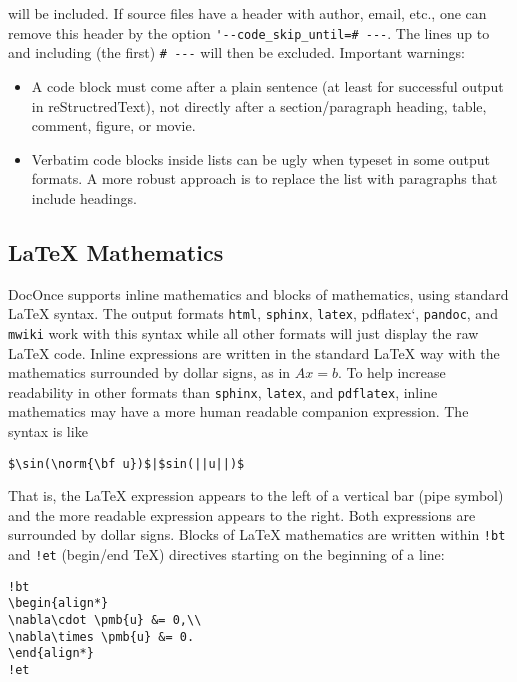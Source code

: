 \documentclass[%
oneside,                 %
final,                   %
10pt]{article}
\begin{document}
will be included. If source files have a header with author, email, etc.,
one can remove this header by the option \Verb!'--code_skip_until=# ---!.
The lines up to and including (the first) \Verb!# ---! will then be excluded.
Important warnings:
\begin{itemize}
 \item A code block must come after a plain sentence (at least for successful
   output in reStructredText), not directly after a section/paragraph heading,
   table, comment, figure, or movie.
 \item Verbatim code blocks inside lists can be ugly when typeset in some
   output formats. A more robust approach is to replace the list with
   paragraphs that include headings.
\end{itemize}
\noindent
\subsection{{\LaTeX} Mathematics}
DocOnce supports inline mathematics and blocks of mathematics, using
standard {\LaTeX} syntax. The output formats \texttt{html}, \texttt{sphinx}, \texttt{latex},
pdflatex`, \texttt{pandoc}, and \texttt{mwiki} work with this syntax while all other
formats will just display the raw {\LaTeX} code.
Inline expressions are written in the standard
{\LaTeX} way with the mathematics surrounded by dollar signs, as in
$Ax=b$. To help increase readability in other formats than \texttt{sphinx},
\texttt{latex}, and \texttt{pdflatex}, inline mathematics may have a more human
readable companion expression. The syntax is like
\begin{Verbatim}[numbers=none,fontsize=\fontsize{9pt}{9pt},baselinestretch=0.95,xleftmargin=2mm]
$\sin(\norm{\bf u})$|$sin(||u||)$

\end{Verbatim}

That is, the {\LaTeX} expression appears to the left of a vertical bar (pipe
symbol) and the more readable expression appears to the right. Both
expressions are surrounded by dollar signs.
Blocks of {\LaTeX} mathematics are written within
\Verb?!bt?
and
\Verb?!et? (begin/end TeX) directives starting on the beginning of a line:
\begin{Verbatim}[numbers=none,fontsize=\fontsize{9pt}{9pt},baselinestretch=0.95,xleftmargin=2mm]
!bt
\begin{align*}
\nabla\cdot \pmb{u} &= 0,\\ 
\nabla\times \pmb{u} &= 0.
\end{align*}
!et

\end{Verbatim}
\end{document}
